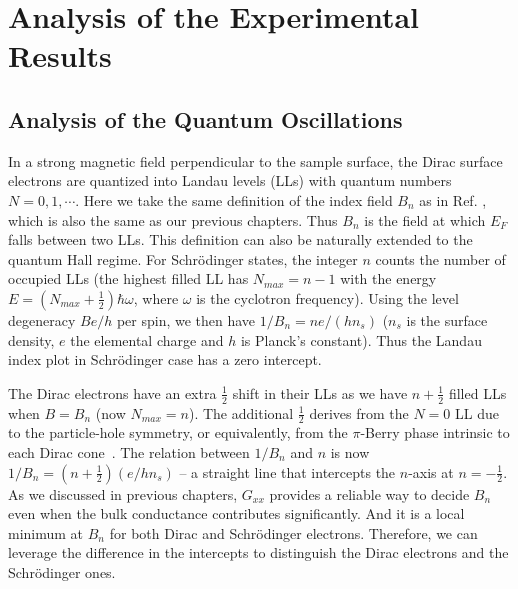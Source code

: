 \section{Analysis of the Experimental Results}
\label{sec:liquid:analysis}

\subsection{Analysis of the Quantum Oscillations}
In a strong magnetic field perpendicular to the sample surface, the Dirac surface electrons are quantized into Landau levels (LLs) with quantum numbers $N = 0,1,\cdots$. Here we take the same definition of the index field $B_n$ as in Ref. \cite{Xiong2012b}, which is also the same as our previous chapters. Thus $B_n$ is the field at which $E_F$ falls between two LLs. This definition can also be naturally extended to the quantum Hall regime.
For Schr\"odinger states, the integer $n$ counts the number of 
occupied LLs (the highest filled LL has $N_{max} = n-1$ with the energy $E = (N_{max}+\frac12)\hbar \omega$, where $\omega$ is the cyclotron frequency). Using the level 
degeneracy $Be/h$ per spin, we then have $1/B_n = ne/(hn_s)$ 
($n_s$ is the surface density, $e$ the elemental charge and $h$ is Planck's constant). Thus the Landau index plot in Schr\"odinger case has a zero intercept.

The Dirac electrons have an extra $\frac12$ shift in their LLs as we have
$n+\frac12$ filled LLs when $B = B_n$ (now $N_{max} = n$).
The additional $\frac12$ derives from the $N=0$ LL due to the particle-hole symmetry, or equivalently, 
from the $\pi$-Berry phase intrinsic to each Dirac cone~\cite{Kim}. 
The relation between $1/B_n$ and $n$ is now 
$ 1/B_n = (n+\frac12)(e/h n_s)$ -- a straight line that 
intercepts the $n$-axis at $n = -\frac12$. 
As we discussed in previous chapters, $G_{xx}$ provides a reliable way to decide $B_n$ even when the bulk conductance contributes significantly. And it is a local minimum at $B_n$ for both Dirac and Schr\"odinger electrons. Therefore, we can leverage the difference in the intercepts to distinguish the Dirac electrons and the Schr\"odinger ones.

